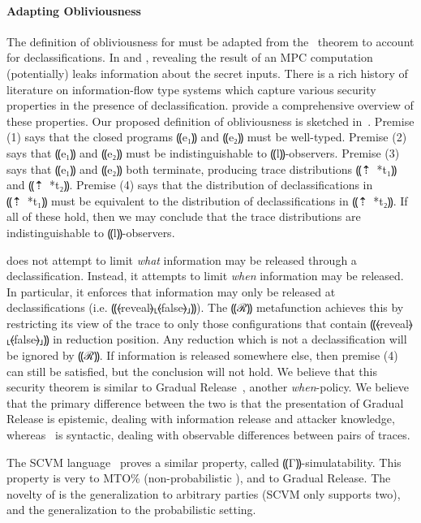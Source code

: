 \paragraph*{Adapting Obliviousness}

The definition of obliviousness for \lang must be adapted from the~ theorem
to account for declassifications. In \mpc and \lang, revealing the result of an MPC computation
(potentially) leaks information about the secret inputs. There is a rich history of literature
on information-flow type systems which capture various security properties in the presence of
declassification. \citet{Sabelfeld2009DeclassificationDA} provide a comprehensive overview of these properties.
Our proposed definition of obliviousness is sketched in~. Premise (1) says that
the closed programs ⸨e₁⸩ and ⸨e₂⸩ must be well-typed. Premise (2) says that ⸨e₁⸩ and ⸨e₂⸩ must be
indistinguishable to ⸨l⸩-observers. Premise (3) says that ⸨e₁⸩ and ⸨e₂⸩ both terminate, producing trace
distributions ⸨⇡~*{t₁}⸩ and ⸨⇡~*{t₂}⸩. Premise (4) says that the distribution of declassifications
in ⸨⇡~*{t₁}⸩ must be equivalent to the distribution of declassifications in ⸨⇡~*{t₂}⸩. If all of
these hold, then we may conclude that the trace distributions are indistinguishable to ⸨l⸩-observers.

 does not attempt to limit \emph{what} information may be released through a declassification.
Instead, it attempts to limit \emph{when} information may be released. In particular, it enforces that information may
only be released at declassifications (i.e. ⸨⦑reveal⦒⸤⦑false⦒⸥⸩). The ⸨ℛ⸩ metafunction achieves this by restricting
its view of the trace to only those configurations that contain ⸨⦑reveal⦒⸤⦑false⦒⸥⸩ in reduction position. Any reduction
which is not a declassification will be ignored by ⸨ℛ⸩. If information is released somewhere else,
then premise (4) can still be satisfied, but the conclusion will not hold. We believe that this security theorem is
similar to Gradual Release~\cite{gradual-release}, another \emph{when}-policy. We believe that the primary difference
between the two is that the presentation of Gradual Release is epistemic, dealing with information release and attacker knowledge,
whereas~ is syntactic, dealing with observable differences between pairs of traces.

The SCVM language~\cite{liu14scram} proves a similar property, called ⸨Γ⸩-simulatability. This property is very to MTO\%
(non-probabilistic ), and to Gradual Release. The novelty of \lang is the generalization to
arbitrary parties (SCVM only supports two), and the generalization to the probabilistic setting.

